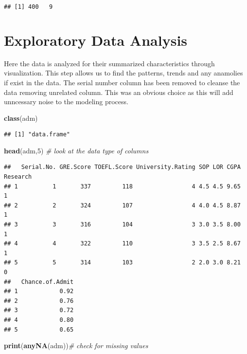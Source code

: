 \documentclass[11pt,]{article}
\newenvironment{Shaded}{\begin{snugshade}}{\end{snugshade}}
\newcommand{\CommentTok}[1]{\textcolor[rgb]{0.56,0.35,0.01}{\textit{#1}}}
\newcommand{\DecValTok}[1]{\textcolor[rgb]{0.00,0.00,0.81}{#1}}
\newcommand{\KeywordTok}[1]{\textcolor[rgb]{0.13,0.29,0.53}{\textbf{#1}}}
\newcommand{\NormalTok}[1]{#1}
\begin{document}
\begin{verbatim}
## [1] 400   9
\end{verbatim}

\hypertarget{exploratory-data-analysis}{%
\section{Exploratory Data Analysis}\label{exploratory-data-analysis}}

Here the data is analyzed for their summarized characteristics through
visualization. This step allows us to find the patterns, trends and any
anamolies if exist in the data. The serial number column has been
removed to cleanse the data removing unrelated column. This was an
obvious choice as this will add unncessary noise to the modeling
process.

\begin{Shaded}
\begin{Highlighting}[]
\KeywordTok{class}\NormalTok{(adm)}
\end{Highlighting}
\end{Shaded}

\begin{verbatim}
## [1] "data.frame"
\end{verbatim}

\begin{Shaded}
\begin{Highlighting}[]
\KeywordTok{head}\NormalTok{(adm,}\DecValTok{5}\NormalTok{) }\CommentTok{# look at the data type of columns}
\end{Highlighting}
\end{Shaded}

\begin{verbatim}
##   Serial.No. GRE.Score TOEFL.Score University.Rating SOP LOR CGPA Research
## 1          1       337         118                 4 4.5 4.5 9.65        1
## 2          2       324         107                 4 4.0 4.5 8.87        1
## 3          3       316         104                 3 3.0 3.5 8.00        1
## 4          4       322         110                 3 3.5 2.5 8.67        1
## 5          5       314         103                 2 2.0 3.0 8.21        0
##   Chance.of.Admit
## 1            0.92
## 2            0.76
## 3            0.72
## 4            0.80
## 5            0.65
\end{verbatim}

\begin{Shaded}
\begin{Highlighting}[]
\KeywordTok{print}\NormalTok{(}\KeywordTok{anyNA}\NormalTok{(adm))}\CommentTok{# check for missing values}
\end{Highlighting}
\end{Shaded}
\end{document}

